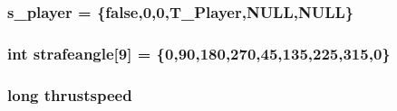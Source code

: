 \label{WL__AGENT_8C_a8cf5fca2f0794aeeca4ba0504e1230ef}
\hypertarget{WL__AGENT_8C_aef2c7d76826104ab1e029f84a95c41c7}{
\subsubsection[{s\_\-player}]{ {\bf s\_\-player} = \{false,0,0,T\_\-Player,NULL,NULL\}}}
\label{WL__AGENT_8C_aef2c7d76826104ab1e029f84a95c41c7}
\hypertarget{WL__AGENT_8C_a57082f1acfc5cc0d2e86c88c1d22adff}{
\subsubsection[{strafeangle}]{\setlength{\rightskip}{0pt plus 5cm}int {\bf strafeangle}\mbox{[}9\mbox{]} = \{0,90,180,270,45,135,225,315,0\}}}
\label{WL__AGENT_8C_a57082f1acfc5cc0d2e86c88c1d22adff}
\hypertarget{WL__AGENT_8C_ac9683e4ab6c67081743f542dc09a74c0}{
\subsubsection[{thrustspeed}]{\setlength{\rightskip}{0pt plus 5cm}long {\bf thrustspeed}}}
\label{WL__AGENT_8C_ac9683e4ab6c67081743f542dc09a74c0}
